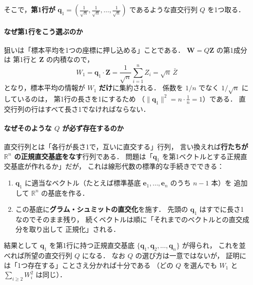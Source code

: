 \documentclass[lualatex,ja=standard,a4paper,12pt]{bxjsarticle}
\begin{document}
\medskip
そこで，\textbf{第1行が}
$\boldsymbol{q}_1 = \left(\tfrac{1}{\sqrt{n}}, \tfrac{1}{\sqrt{n}}, \ldots, \tfrac{1}{\sqrt{n}}\right)$
であるような直交行列 $Q$ を1つ取る．

\paragraph{なぜ第1行をこう選ぶのか}
狙いは「標本平均を1つの座標に押し込める」ことである．
$\boldsymbol{W} = Q\boldsymbol{Z}$ の第1成分は
第1行と $\boldsymbol{Z}$ の内積なので，
\[
  W_1 = \boldsymbol{q}_1 \cdot \boldsymbol{Z}
      = \frac{1}{\sqrt{n}}\sum_{i=1}^n Z_i = \sqrt{n}\,\bar{Z}
\]
となり，標本平均の情報が $W_1$ \textbf{だけ}に集約される．
係数を $1/n$ でなく $1/\sqrt{n}$ にしているのは，
第1行の長さを1にするため
（$\|\boldsymbol{q}_1\|^2 = n \cdot \frac{1}{n} = 1$）である．
直交行列の行はすべて長さ1でなければならない．

\paragraph{なぜそのような $Q$ が必ず存在するのか}
直交行列とは「各行が長さ1で，互いに直交する」行列，
言い換えれば\textbf{行たちが $\mathbb{R}^n$ の正規直交基底をなす}行列である．
問題は「$\boldsymbol{q}_1$ を第1ベクトルとする正規直交基底が作れるか」だが，
これは線形代数の標準的な手続きでできる：
\begin{enumerate}
  \item $\boldsymbol{q}_1$ に適当なベクトル（たとえば標準基底
        $\boldsymbol{e}_1, \ldots, \boldsymbol{e}_n$ のうち $n-1$ 本）を
        追加して $\mathbb{R}^n$ の基底を作る．
  \item この基底に\textbf{グラム・シュミットの直交化}を施す．
        先頭の $\boldsymbol{q}_1$ はすでに長さ1なのでそのまま残り，
        続くベクトルは順に「それまでのベクトルとの直交成分を取り出して
        正規化」される．
\end{enumerate}
結果として $\boldsymbol{q}_1$ を第1行に持つ正規直交基底
$\{\boldsymbol{q}_1, \boldsymbol{q}_2, \ldots, \boldsymbol{q}_n\}$ が得られ，
これを並べれば所望の直交行列 $Q$ になる．
なお $Q$ の選び方は一意ではないが，
証明には「1つ存在する」ことさえ分かれば十分である
（どの $Q$ を選んでも $W_1$ と $\sum_{i \geq 2} W_i^2$ は同じ）．
\end{document}
